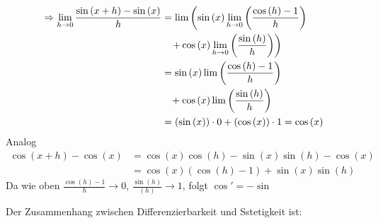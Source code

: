 \begin{enumerate}
\begin{align*}
 \Rightarrow \mathop {\lim }\limits_{h \to 0} \frac{{\sin \left( {x + h} \right) - \sin \left( x \right)}}{h} &= \lim \left( {\sin \left( x \right)\mathop {\lim }\limits_{h \to 0} \left( {\frac{{\cos \left( h \right) - 1}}{h}} \right)} \right.\\
&\left. { \hspace{3mm}+ \cos \left( x \right)\mathop {\lim }\limits_{h \to 0} \left( {\frac{{\sin \left( h \right)}}{h}} \right)} \right)\\
 &= \sin \left( x \right)\lim \left( {\frac{{\cos \left( h \right) - 1}}{h}} \right)\\
 &\hspace{3mm}+ \cos \left( x \right)\lim \left( {\frac{{\sin \left( h \right)}}{h}} \right)\\
& = \left( {\sin \left( x \right)} \right) \cdot 0 + \left( {\cos \left( x \right)} \right) \cdot 1 = \cos \left( x \right)
\end{align*}
Analog
\begin{align*}
\cos \left( {x + h} \right) - \cos \left( x \right) &= \cos \left( x \right)\cos \left( h \right) - \sin \left( x \right)\sin \left( h \right) - \cos \left( x \right)\\
& = \cos \left( x \right)\left( {\cos \left( h \right) - 1} \right) + \sin \left( x \right)\sin \left( h \right)
\end{align*}
Da wie oben $\frac{{\cos \left( h \right) - 1}}{h} \to 0$, $\frac{{\sin \left( h \right)}}{{\left( h \right)}} \to 1$, folgt $\cos'=-\sin$
\end{enumerate}
Der Zusammenhang zwischen Differenzierbarkeit und Sstetigkeit ist:
